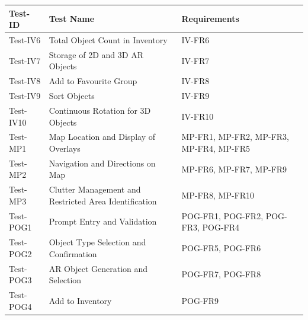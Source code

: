 \documentclass[12pt, titlepage]{article}
\begin{document}
\begin{table}[htpb!]
  \centering
  \begin{tabular}{|l|p{8cm}|p{3cm}|}
    \hline
    \textbf{Test-ID} & \textbf{Test Name}                                    & \textbf{Requirements}                                           \\
    \hline
    Test-IV6         & Total Object Count in Inventory                       & IV-FR6                                                          \\
    \hline
    Test-IV7         & Storage of 2D and 3D AR Objects                       & IV-FR7                                                          \\
    \hline
    Test-IV8         & Add to Favourite Group                                & IV-FR8                                                          \\
    \hline
    Test-IV9         & Sort Objects                                          & IV-FR9                                                          \\
    \hline
    Test-IV10        & Continuous Rotation for 3D Objects                    & IV-FR10                                                         \\
    \hline
    Test-MP1         & Map Location and Display of Overlays                  & MP-FR1, MP-FR2, MP-FR3, MP-FR4, MP-FR5                          \\
    \hline
    Test-MP2         & Navigation and Directions on Map                      & MP-FR6, MP-FR7, MP-FR9                                          \\
    \hline
    Test-MP3         & Clutter Management and Restricted Area Identification & MP-FR8, MP-FR10                                                 \\
    \hline
    Test-POG1        & Prompt Entry and Validation                           & POG-FR1, POG-FR2, POG-FR3, POG-FR4                              \\
    \hline
    Test-POG2        & Object Type Selection and Confirmation                & POG-FR5, POG-FR6                                                \\
    \hline
    Test-POG3        & AR Object Generation and Selection                    & POG-FR7, POG-FR8                                                \\
    \hline
    Test-POG4        & Add to Inventory                                      & POG-FR9                                                         \\

\end{tabular}
\end{table}
\end{document}
